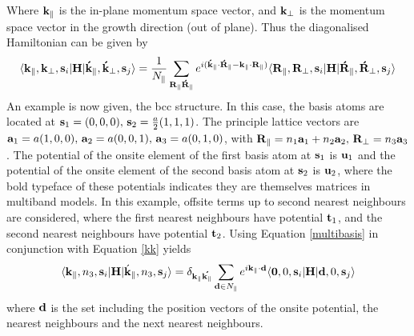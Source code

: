 \documentclass[a4paper, 12pt]{article}
\begin{document}
	Where ${\bf k}_\parallel$ is the in-plane momentum space vector, and ${\bf k}_\perp$ is the momentum space vector in the growth direction (out of plane).
	Thus the diagonalised Hamiltonian can be given by 
	\begin{equation}\label{multibasis}
		\langle{\bf k}_\parallel, {\bf k}_\perp, {\bf s}_i|{\bf H}|{\bf \acute{k}}_\parallel, {\bf \acute{k}}_\perp, {\bf s}_j\rangle = \frac{1}{N_\parallel}\sum_{\bf R_\parallel \acute{R}_\parallel}  e^{i({\bf \acute{k}}_\parallel\cdot {\bf \acute{R}}_\parallel-{\bf k}_\parallel\cdot {\bf R}_\parallel)} \langle{\bf R}_\parallel,{\bf R}_\perp, {\bf s}_i|{\bf H}|{\bf \acute{R}}_\parallel,{\bf \acute{R}}_\perp, {\bf s}_j \rangle
	\end{equation}
	An example is now given, the \gls{bcc} structure.
	In this case, the basis atoms are located at ${\bf s}_1=(0,0,0), \, {\bf s}_2=\frac{a}{2}(1,1,1)$.
	The principle lattice vectors are ${\bf a}_1 = a(1,0,0), \, {\bf a}_2 = a(0,0,1), \, {\bf a}_3 = a(0,1,0)$,
	with ${\bf R}_\parallel = n_1{\bf a}_1 + n_2{\bf a}_2, \, {\bf R}_\perp = n_3 {\bf a}_3$.
	The potential of the onsite element of the first basis atom at ${\bf s}_1$ is ${\bf u}_1$ and the potential of the onsite element of the second basis atom at ${\bf s}_2$ is ${\bf u}_2$,
	where the bold typeface of these potentials indicates they are themselves matrices in multiband models.
	In this example, offsite terms up to second nearest neighbours are considered, where the first nearest neighbours have potential ${\bf t}_1$, and the second nearest neighbours have potential ${\bf t}_2$.
	Using Equation \eqref{multibasis} in conjunction with Equation \eqref{kk} yields
	\begin{equation}
		\langle{\bf k}_\parallel, n_3, {\bf s}_i|{\bf H}|\acute{\bf k}_\parallel, n_3, {\bf s}_j\rangle = \delta_{\bf k_\parallel\acute{k_\parallel}}\sum_{{\bf d}\in N_\parallel}e^{i\bf k_\parallel \cdot d}\langle{\bf 0}, 0, {\bf s}_i|{\bf H}|{\bf d}, 0, {\bf s}_j\rangle
	\end{equation}
	where $\bf d$ is the set including the position vectors of the onsite potential, the nearest neighbours and the next nearest neighbours.
\end{document}
